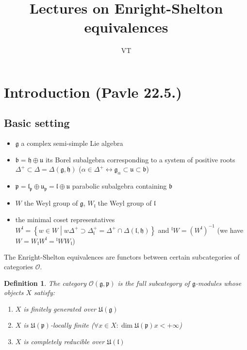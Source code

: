\documentclass[a4paper,10pt]{article}
\title{Lectures on Enright-Shelton equivalences}
\author{VT}
\begin{document}
\newcommand{\lie}[1]{\mathfrak{#1}}
\newcommand{\roots}{\Delta}
\newcommand{\Hom}{\mathrm{Hom}}
\newcommand{\Ext}{\mathrm{Ext}}
\newcommand{\killing}[2]{\langle #1, #2 \rangle}
\newcommand{\et}{\,\&\,}

\newtheorem{theorem}{Theorem}[section]
\newtheorem{remark}[theorem]{Remark}
\newtheorem{proposition}[theorem]{Proposition}
\newtheorem{corollary}[theorem]{Corollary}
\newtheorem{definition}[theorem]{Definition}
\newtheorem{lemma}[theorem]{Lemma}
\newtheorem{notation}[theorem]{Notation}
\newtheorem{example}[theorem]{Example}


\maketitle

\section{Introduction (Pavle 22.5.)}

\subsection{Basic setting}
\begin{itemize}
 \item $\lie{g}$ a complex semi-simple Lie algebra
 \item $\lie{b} = \lie{h} \oplus \lie{u}$ its Borel subalgebra corresponding to a system of positive roots $\roots^+ \subset \roots = \roots(\lie{g}, \lie{h})$ ($\alpha \in \roots^+ \leftrightarrow \lie{g}_\alpha \subset \lie{u}\subset\lie{b}$)
 \item $\lie{p} = \lie{l}_\lie{p} \oplus \lie{u}_\lie{p} = \lie{l} \oplus \lie{u}$ parabolic subalgebra containing $\lie{b}$ 
 \item $W$ the Weyl group of $\lie{g}$, $W_\lie{l}$ the Weyl group of $\lie{l}$
 \item the minimal coset representatives $W^\lie{l} = \left\{ w \in W \middle| w\roots^+ \supset \roots^+_\lie{l} = \roots^+ \cap \roots(\lie{l}, \lie{h}) \right\}$ and ${}^\lie{l} W = (W^\lie{l})^{-1}$ (we have $W = W_\lie{l}W^\lie{l} = {}^\lie{l}WW_\lie{l}$)
\end{itemize}

The Enright-Shelton equivalences are functors between certain subcategories of categories $\mathcal{O}$. 
\begin{definition}
The category $\mathcal{O}(\lie{g},\lie{p})$ is the full subcategory of $\lie{g}$-modules whose objects $X$ satisfy:
\begin{enumerate}
 \item $X$ is finitely generated over $\lie{U(g)}$
 \item $X$ is $\lie{U(p)}$-locally finite ($\forall x\in X \colon \dim \lie{U(p)} x < +\infty$)
 \item $X$ is completely reducible over $\lie{U(l)}$
\end{enumerate}
\end{definition}
\end{document}
